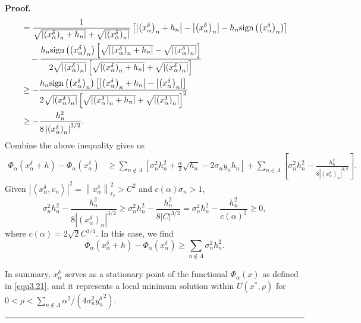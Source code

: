 \documentclass[a4paper,12pt]{article}
\numberwithin{equation}{section}
\newenvironment{proof}[1][Proof]{\textbf{#1.} }
{\ \rule{0.75em}{0.75em}\smallskip}
\begin{document}
\begin{proof}
\begin{align*}
        & =\frac{1}{\sqrt{\left|\left(x_{\alpha}^{\delta}\right)_{n}+h_{n}\right|}+ \sqrt{\left|\left(x_{\alpha}^{\delta}\right)_{n}\right|}} \left[\left|\left(x_{\alpha}^{\delta}\right)_{n}+h_{n}\right|- \left|\left(x_{\alpha}^{\delta}\right)_{n}\right|-h_{n}{\rm sign} \left(\left(x_{\alpha}^{\delta}\right)_{n}\right)\right] \\
        & \quad -\frac{h_{n}{\rm sign} \left(\left(x_{\alpha}^{\delta}\right)_{n}\right) \left[\sqrt{\left|\left(x_{\alpha}^{\delta}\right)_{n}+h_{n}\right|}- \sqrt{\left|\left(x_{\alpha}^{\delta}\right)_{n}\right|}\right]} {2\sqrt{\left|\left(x_{\alpha}^{\delta}\right)_{n}\right|} \left[\sqrt{\left|\left(x_{\alpha}^{\delta}\right)_{n}+h_{n}\right|}+ \sqrt{\left|\left(x_{\alpha}^{\delta}\right)_{n}\right|}\right]} \\
        & \geq  -\frac{h_{n} {\rm sign} \left(\left(x_{\alpha}^{\delta}\right)_{n}\right) \left[\left|\left(x_{\alpha}^{\delta}\right)_{n}+h_{n}\right|- \left|\left(x_{\alpha}^{\delta}\right)_{n}\right|\right]} {2\sqrt{\left|\left(x_{\alpha}^{\delta}\right)_{n}\right|} \left[\sqrt{\left|\left(x_{\alpha}^{\delta}\right)_{n}+h_{n}\right|}+ \sqrt{\left|\left(x_{\alpha}^{\delta}\right)_{n}\right|}\right]^{2}} \nonumber\\
        & \geq -\frac{h_{n}^{2}}{8\left|\left(x_{\alpha}^{\delta}\right)_{n}\right|^{3/2}}.
    \end{align*}
    Combine the above inequality gives us
    \begin{align*}
        \Phi_{\alpha}\left(x_{\alpha}^{\delta}+h\right)-\Phi_{\alpha}\left(x_{\alpha}^{\delta}\right)
        & \geq\sum_{n\notin\Lambda}\left[\sigma_{n}^{2}h_{n}^{2}+\frac{\alpha}{2}\sqrt{h_{n}} -2\sigma_{n}y_{n}h_{n}\right] +\sum_{n\in\Lambda}\left[\sigma_{n}^{2}h_{n}^{2} -\frac{h_{n}^{2}}{8\left|\left(x_{\alpha}^{\delta}\right)_{n}\right|^{3/2}}\right].
    \end{align*}
    Given $\left|\left<x_{\alpha}^{\delta},v_{n}\right>\right|^{2}= \left\|x_{\alpha}^{\delta}\right\|_{\ell_{2}}^{2}>C^{2}$ and $c(\alpha)\sigma_{n}>1$,
    \begin{equation*}
        \sigma_{n}^{2}h_{n}^{2}-\frac{h_{n}^{2}}{8\left|\left(x_{\alpha}^{\delta}\right)_{n}\right| ^{3/2}} \geq \sigma_{n}^{2}h_{n}^{2}-\frac{h_{n}^{2}}{8|C|^{3/2}} = \sigma_{n}^{2}h_{n}^{2}-\frac{h_{n}^{2}}{c(\alpha)^{2}}\geq 0,
    \end{equation*}
    where $c(\alpha)=2\sqrt{2}C^{3/4}$. In this case, we find 
    \begin{equation*}
        \Phi_{\alpha}\left(x_{\alpha}^{\delta}+h\right)-\Phi_{\alpha}\left(x_{\alpha}^{\delta}\right)\geq\sum_{n\notin\Lambda}\sigma_{n}^{2}h_{n}^{2}.
    \end{equation*}
    \par In summary, $x_{\alpha}^{\delta}$ serves as a stationary point of the functional $\Phi_{\alpha}\left(x\right)$ as defined in \eqref{equ3.21}, and it represents a local minimum solution within $U(x^{*},\rho)$ for $0<\rho<\sum_{n\notin\Lambda}\alpha^{2} /(4\sigma_{n}^{2} {y^{\delta}_{n}}^{2})$.
\end{proof}
\end{document}
